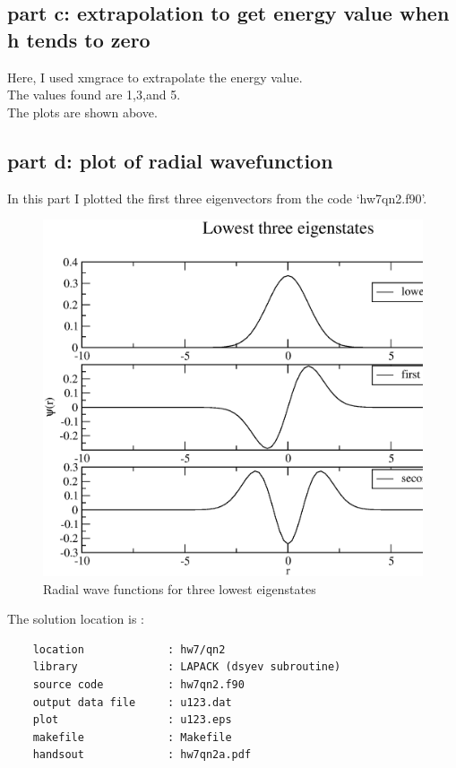 \documentclass[11pt,a4paper,english]{article}
\begin{document}
   \subsection{part c: extrapolation to get energy value when h tends to zero}
	
	Here, I used xmgrace to extrapolate the energy value.\\
	The values found are 1,3,and 5.\\
	The plots are shown above.\\	
	\subsection{part d: plot of radial wavefunction }
    In this part I plotted the first three eigenvectors from the code `hw7qn2.f90'.\\
	\begin{figure}[h!]
	\centering
	\includegraphics [scale=0.6]{u123.eps}
	\caption{Radial wave functions for three lowest eigenstates }
	\end{figure}
	\clearpage
    The solution location is :\\
	\begin{verbatim}
	location             : hw7/qn2
	library              : LAPACK (dsyev subroutine)
	source code          : hw7qn2.f90
	output data file     : u123.dat
	plot                 : u123.eps
	makefile             : Makefile
	handsout             : hw7qn2a.pdf
	\end{verbatim} 
\end{document}
